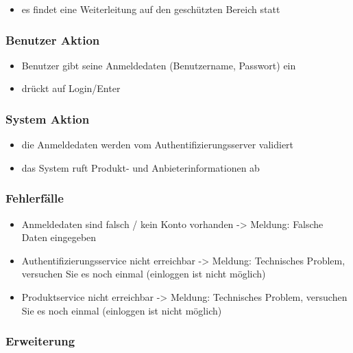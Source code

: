 \documentclass[a4paper,12pt]{article}
\begin{document}
\begin{itemize}
\item
  es findet eine Weiterleitung auf den geschützten Bereich statt
\end{itemize}

\subsubsection{Benutzer Aktion}\label{benutzer-aktion}

\begin{itemize}
\item
  Benutzer gibt seine Anmeldedaten (Benutzername, Passwort) ein
\item
  drückt auf Login/Enter
\end{itemize}

\subsubsection{System Aktion}\label{system-aktion}

\begin{itemize}
\item
  die Anmeldedaten werden vom Authentifizierungsserver validiert
\item
  das System ruft Produkt- und Anbieterinformationen ab
\end{itemize}

\subsubsection{Fehlerfälle}\label{fehlerfalle}

\begin{itemize}
\item
  Anmeldedaten sind falsch / kein Konto vorhanden -\textgreater{}
  Meldung: Falsche Daten eingegeben
\item
  Authentifizierungsservice nicht erreichbar -\textgreater{} Meldung:
  Technisches Problem, versuchen Sie es noch einmal (einloggen ist nicht
  möglich)
\item
  Produktservice nicht erreichbar -\textgreater{} Meldung: Technisches
  Problem, versuchen Sie es noch einmal (einloggen ist nicht möglich)
\end{itemize}

\subsubsection{Erweiterung}\label{erweiterung}
\end{document}
